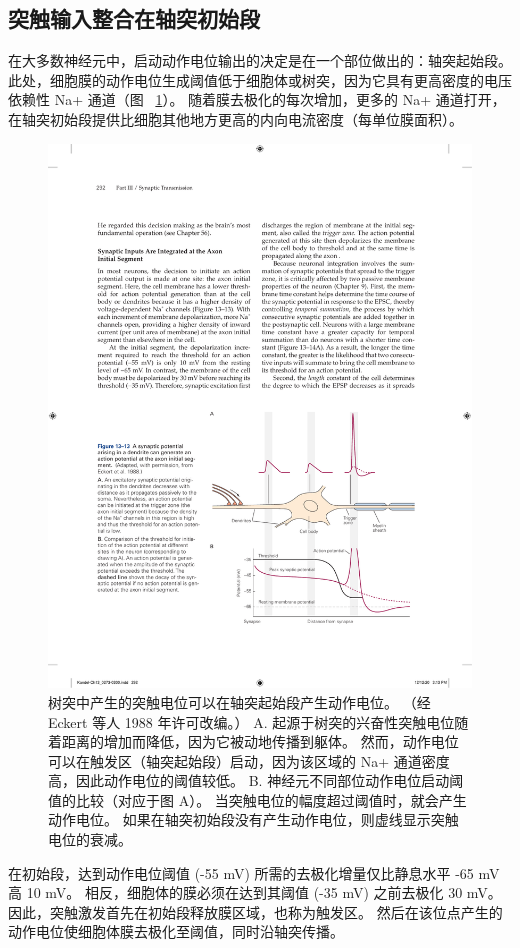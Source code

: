 \subsection{突触输入整合在轴突初始段}

在大多数神经元中，启动动作电位输出的决定是在一个部位做出的：轴突起始段。
此处，细胞膜的动作电位生成阈值低于细胞体或树突，因为它具有更高密度的电压依赖性 Na+ 通道（图 ~\ref{fig:13_13}）。
随着膜去极化的每次增加，更多的 Na+ 通道打开，在轴突初始段提供比细胞其他地方更高的内向电流密度（每单位膜面积）。


\begin{figure}[htbp]
	\centering
	\includegraphics[width=0.7\linewidth]{chap13/fig_13_13}
	\caption{树突中产生的突触电位可以在轴突起始段产生动作电位。 （经 Eckert 等人 1988 年许可改编。） A. 起源于树突的兴奋性突触电位随着距离的增加而降低，因为它被动地传播到躯体。 然而，动作电位可以在触发区（轴突起始段）启动，因为该区域的 Na+ 通道密度高，因此动作电位的阈值较低。 B. 神经元不同部位动作电位启动阈值的比较（对应于图 A）。 当突触电位的幅度超过阈值时，就会产生动作电位。 如果在轴突初始段没有产生动作电位，则虚线显示突触电位的衰减。}
	\label{fig:13_13}
\end{figure}


在初始段，达到动作电位阈值 (-55 mV) 所需的去极化增量仅比静息水平 -65 mV 高 10 mV。
相反，细胞体的膜必须在达到其阈值 (-35 mV) 之前去极化 30 mV。
因此，突触激发首先在初始段释放膜区域，也称为触发区。
然后在该位点产生的动作电位使细胞体膜去极化至阈值，同时沿轴突传播。


